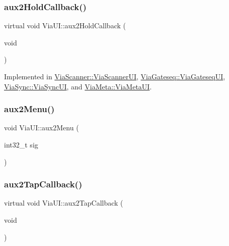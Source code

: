 \mbox{\label{class_via_u_i_a42545b69c2bbbb036f633140fd8007d6}} 
\subsubsection{\texorpdfstring{aux2\+Hold\+Callback()}{aux2HoldCallback()}}
{\footnotesize\ttfamily virtual void Via\+U\+I\+::aux2\+Hold\+Callback (\begin{DoxyParamCaption}\item[{void}]{ }\end{DoxyParamCaption})\hspace{0.3cm}{\ttfamily [pure virtual]}}



Implemented in \mbox{\hyperlink{class_via_scanner_1_1_via_scanner_u_i_a929ba662a65fd62f9c5b122accad48a4}{Via\+Scanner\+::\+Via\+Scanner\+UI}}, \mbox{\hyperlink{class_via_gateseq_1_1_via_gateseq_u_i_a825cc56cdbeffd7eee887e8f189cb35d}{Via\+Gateseq\+::\+Via\+Gateseq\+UI}}, \mbox{\hyperlink{class_via_sync_1_1_via_sync_u_i_af692a47db686fac2e929549217452258}{Via\+Sync\+::\+Via\+Sync\+UI}}, and \mbox{\hyperlink{class_via_meta_1_1_via_meta_u_i_a19cac5da8e89446d5ee2a2c889a6c555}{Via\+Meta\+::\+Via\+Meta\+UI}}.

\mbox{\label{class_via_u_i_a928f20f199d42ce05487d5ed7bffd574}} 
\subsubsection{\texorpdfstring{aux2\+Menu()}{aux2Menu()}}
{\footnotesize\ttfamily void Via\+U\+I\+::aux2\+Menu (\begin{DoxyParamCaption}\item[{int32\+\_\+t}]{sig }\end{DoxyParamCaption})}

\mbox{\label{class_via_u_i_ae5e009dc22002f62e6bff8dd76d2f745}} 
\subsubsection{\texorpdfstring{aux2\+Tap\+Callback()}{aux2TapCallback()}}
{\footnotesize\ttfamily virtual void Via\+U\+I\+::aux2\+Tap\+Callback (\begin{DoxyParamCaption}\item[{void}]{ }\end{DoxyParamCaption})\hspace{0.3cm}{\ttfamily [pure virtual]}}



